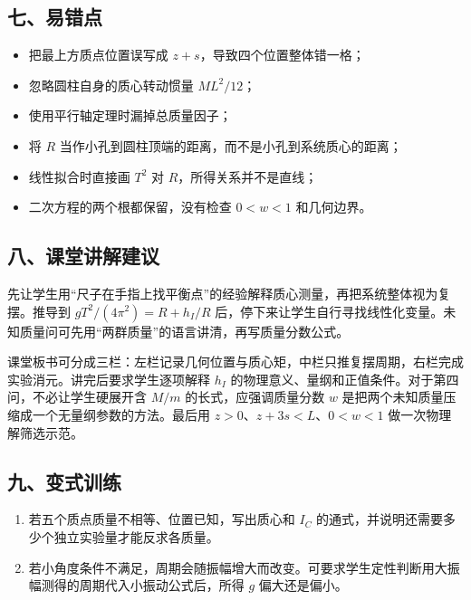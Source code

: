 \documentclass[12pt,a4paper,UTF8]{ctexart}
\newcommand{\tightlist}{\setlength{\itemsep}{0pt}\setlength{\parskip}{0pt}}
\begin{document}
\subsection{七、易错点}\label{ux4e03ux6613ux9519ux70b9}

\begin{itemize}
\tightlist
\item
  把最上方质点位置误写成 \(z+s\)，导致四个位置整体错一格；
\item
  忽略圆柱自身的质心转动惯量 \(ML^2/12\)；
\item
  使用平行轴定理时漏掉总质量因子；
\item
  将 \(R\) 当作小孔到圆柱顶端的距离，而不是小孔到系统质心的距离；
\item
  线性拟合时直接画 \(T^2\) 对 \(R\)，所得关系并不是直线；
\item
  二次方程的两个根都保留，没有检查 \(0<w<1\) 和几何边界。
\end{itemize}

\subsection{八、课堂讲解建议}\label{ux516bux8bfeux5802ux8bb2ux89e3ux5efaux8bae}

先让学生用``尺子在手指上找平衡点''的经验解释质心测量，再把系统整体视为复摆。推导到
\(gT^2/(4\pi^2)=R+h_I/R\)
后，停下来让学生自行寻找线性化变量。未知质量问可先用``两群质量''的语言讲清，再写质量分数公式。

课堂板书可分成三栏：左栏记录几何位置与质心矩，中栏只推复摆周期，右栏完成实验消元。讲完后要求学生逐项解释
\(h_I\) 的物理意义、量纲和正值条件。对于第四问，不必让学生硬展开含
\(M/m\) 的长式，应强调质量分数 \(w\)
是把两个未知质量压缩成一个无量纲参数的方法。最后用
\(z>0\)、\(z+3s<L\)、\(0<w<1\) 做一次物理解筛选示范。

\subsection{九、变式训练}\label{ux4e5dux53d8ux5f0fux8badux7ec3}

\begin{enumerate}
\def\labelenumi{\arabic{enumi}.}
\tightlist
\item
  若五个质点质量不相等、位置已知，写出质心和 \(I_C\)
  的通式，并说明还需要多少个独立实验量才能反求各质量。
\item
  若小角度条件不满足，周期会随振幅增大而改变。可要求学生定性判断用大振幅测得的周期代入小振动公式后，所得
  \(g\) 偏大还是偏小。
\end{enumerate}
\end{document}
